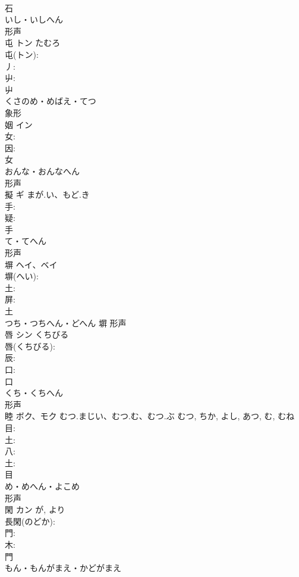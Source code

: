 \documentclass[8pt]{extreport}
\begin{document}
\begin{CJK}{UTF8}{min}
\\	石	
\\	いし・いしへん	
\\	形声 
\\	屯	トン	たむろ		
\\	屯(トン): 
\\	丿: 
\\	屮: 
\\	屮	
\\	くさのめ・めばえ・てつ	
\\	象形 
\\	姻	イン			
\\	女: 
\\	因: 
\\	女	
\\	おんな・おんなへん	
\\	形声 
\\	擬	ギ	まが.い、もど.き		
\\	手: 
\\	疑: 
\\	手	
\\	て・てへん	
\\	形声 
\\	塀	ヘイ、ベイ			
\\	塀(へい): 
\\	土: 
\\	屏: 
\\	土	
\\	つち・つちへん・どへん	塀	形声 
\\	唇	シン	くちびる		
\\	唇(くちびる): 
\\	辰: 
\\	口: 
\\	口	
\\	くち・くちへん	
\\	形声 
\\	睦	ボク、モク	むつ.まじい、むつ.む、むつ.ぶ	むつ, ちか, よし, あつ, む, むね	
\\	目: 
\\	土: 
\\	八: 
\\	土: 
\\	目	
\\	め・めへん・よこめ	
\\	形声 
\\	閑	カン		が, より	
\\	長閑(のどか): 
\\	門: 
\\	木: 
\\	門	
\\	もん・もんがまえ・かどがまえ	

\end{CJK}
\end{document}
